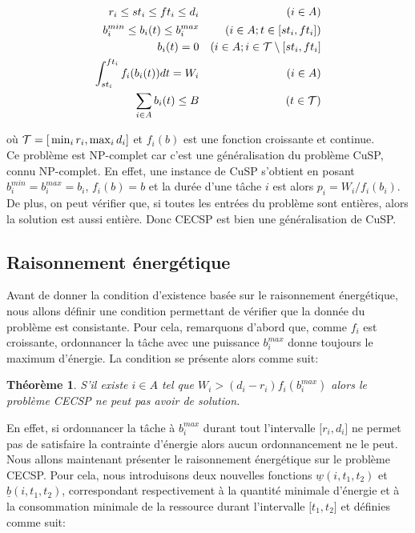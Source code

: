 \documentclass{report}
\newcommand{\bb}{\underline{b}(i,t_1,t_2)}
\newcommand{\wb}{\underline{w}(i,t_1,t_2)}
\newtheorem{Th}{Théorème}
\begin{document}
\begin{align}
  \label{eq1}
  r_i \le st_i \le ft_i \le d_i & & (i \in A)\\
  \label{eq2}
  b_i^{min} \le b_i(t) \le b_i^{max} & & (i \in A; t\in {[}st_i,ft_i{]})\\
  \label{eq3}
  b_i(t)=0 & & (i \in A; i \in {\cal T} \setminus {[}st_i,ft_i{]}\\
  \label{eq4}
  \int_{st_i}^{ft_i} f_i(b_i(t))dt = W_i & & (i \in A)\\
  \label{eq5}
  \sum \limits_{i\in A} b_i(t) \le B & & (t \in {\cal T})
\end{align}

où ${\cal T}={[}\min_i r_i,\max_i d_i{]}$ et $f_i(b)$ est une fonction croissante et continue.\\

Ce problème est NP-complet car c'est une généralisation du problème CuSP, connu NP-complet. En effet, une instance de CuSP s'obtient en posant $b_i^{min}=b_i^{max}=b_i$, $f_i(b)=b$ et la durée d'une tâche $i$ est alors $p_i=W_i/f_i(b_i)$. De plus, on peut vérifier que, si toutes les entrées du problème sont entières, alors la solution est aussi entière. Donc CECSP est bien une généralisation de CuSP.\\

\subsection{Raisonnement énergétique}


Avant de donner la condition d'existence basée sur le raisonnement énergétique, nous allons définir une condition permettant de vérifier que la donnée du problème est consistante. Pour cela, remarquons d'abord que, comme $f_i$ est croissante, ordonnancer la tâche avec une puissance $b_i^{max}$ donne toujours le maximum d'énergie. La condition se présente alors comme suit:

\begin{Th}
  S'il existe $i \in A$ tel que $W_i>(d_i-r_i)f_i(b_i^{max})$ alors le problème CECSP ne peut pas avoir de solution.
\end{Th}

En effet, si ordonnancer la tâche à $b_i^{max}$ durant tout l'intervalle ${[}r_i,d_i{]}$ ne permet pas de satisfaire la contrainte d'énergie alors aucun ordonnancement ne le peut.\\

Nous allons maintenant présenter le raisonnement énergétique sur le problème CECSP. Pour cela, nous introduisons deux nouvelles fonctions $\wb$ et $\bb$, correspondant respectivement à la quantité minimale d'énergie et à la consommation minimale de la ressource durant l'intervalle ${[}t_1,t_2{]}$ et définies comme suit:
\end{document}
